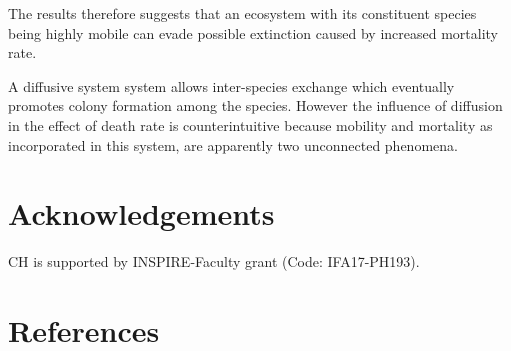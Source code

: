 \documentclass[aps, pre, twocolumn, amsmath, superscriptaddress,showkeys,showpacs]{revtex4-1}
\begin{document}
{%
{The results therefore suggests that an ecosystem with its constituent species being highly mobile can evade possible extinction caused by increased mortality rate.}
\par {A diffusive system system allows inter-species exchange which eventually promotes colony formation among the species. However the influence of diffusion in the effect of death rate is counterintuitive because mobility and mortality as incorporated in this system, are apparently two unconnected phenomena.}



	\section{Acknowledgements} CH is supported by INSPIRE-Faculty grant (Code: IFA17-PH193). \\
	
	\section{References}
	
	

\iffalse
	
}
\end{document}

